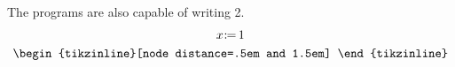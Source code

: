 \begin{example}
The programs are also capable of writing 2.
\begin{align*}
\begin{gathered}
  \PW{x}{1}
  \\
  \hbox{\begin{tikzinline}[node distance=.5em and 1.5em]

\end{tikzinline}}
\end{gathered}
\end{align*}
\end{example}
